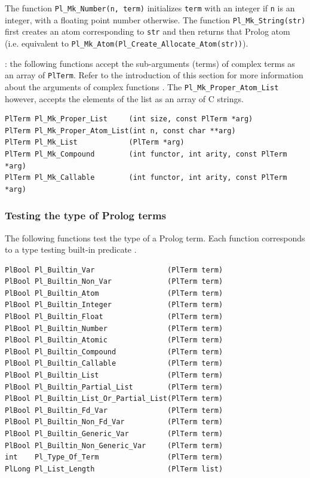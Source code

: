 The function \texttt{Pl\_Mk\_Number(n, term)} initializes \texttt{term} with an
integer if \texttt{n} is an integer, with a floating point number otherwise.
The function \texttt{Pl\_Mk\_String(str)} first creates an atom corresponding to
\texttt{str} and then returns that Prolog atom (i.e. equivalent to
\texttt{Pl\_Mk\_Atom(Pl\_Create\_Allocate\_Atom(str))}).

: the following functions accept the sub-arguments
(terms) of complex terms as an array of \texttt{PlTerm}. Refer to the
introduction of this section for more information about the arguments of
complex functions . The 
\texttt{Pl\_Mk\_Proper\_Atom\_List} however, accepts the elements of the
list as an array of C strings.

\begin{Code}
\begin{verbatim}
PlTerm Pl_Mk_Proper_List     (int size, const PlTerm *arg)
PlTerm Pl_Mk_Proper_Atom_List(int n, const char **arg)
PlTerm Pl_Mk_List            (PlTerm *arg)
PlTerm Pl_Mk_Compound        (int functor, int arity, const PlTerm *arg)
PlTerm Pl_Mk_Callable        (int functor, int arity, const PlTerm *arg)
\end{verbatim}
\end{Code}

\subsubsection{Testing the type of Prolog terms}
\label{Testing-the-type-of-Prolog-terms}
The following functions test the type of a Prolog term. Each function
corresponds to a type testing built-in predicate .

\begin{Code}
\begin{verbatim}
PlBool Pl_Builtin_Var                 (PlTerm term)
PlBool Pl_Builtin_Non_Var             (PlTerm term)
PlBool Pl_Builtin_Atom                (PlTerm term)
PlBool Pl_Builtin_Integer             (PlTerm term)
PlBool Pl_Builtin_Float               (PlTerm term)
PlBool Pl_Builtin_Number              (PlTerm term)
PlBool Pl_Builtin_Atomic              (PlTerm term)
PlBool Pl_Builtin_Compound            (PlTerm term)
PlBool Pl_Builtin_Callable            (PlTerm term)
PlBool Pl_Builtin_List                (PlTerm term)
PlBool Pl_Builtin_Partial_List        (PlTerm term)
PlBool Pl_Builtin_List_Or_Partial_List(PlTerm term)
PlBool Pl_Builtin_Fd_Var              (PlTerm term)
PlBool Pl_Builtin_Non_Fd_Var          (PlTerm term)
PlBool Pl_Builtin_Generic_Var         (PlTerm term)
PlBool Pl_Builtin_Non_Generic_Var     (PlTerm term)
int    Pl_Type_Of_Term                (PlTerm term)
PlLong Pl_List_Length                 (PlTerm list)
\end{verbatim}
\end{Code}

